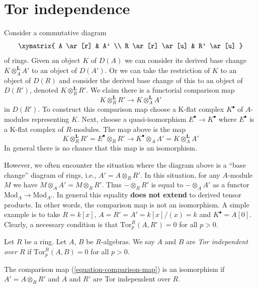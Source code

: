 \section{Tor independence}
\label{section-tor-independence}

\noindent
Consider a commutative diagram
$$
\xymatrix{
A \ar[r] & A' \\
R \ar[r] \ar[u] & R' \ar[u]
}
$$
of rings. Given an object $K$ of $D(A)$ we can consider its derived
base change $K \otimes_A^\mathbf{L} A'$ to an object of $D(A')$.
Or we can take the restriction of $K$ to an object of $D(R)$ and
consider the derived base change of this to an object of $D(R')$,
denoted $K \otimes_R^\mathbf{L} R'$.
We claim there is a functorial comparison map
\begin{equation}
\label{equation-comparison-map}
K \otimes_R^{\mathbf{L}} R'
\longrightarrow
K \otimes_A^{\mathbf{L}} A'
\end{equation}
in $D(R')$. To construct this comparison map choose a K-flat
complex $K^\bullet$ of $A$-modules representing $K$. Next, choose
a quasi-isomorphism $E^\bullet \to K^\bullet$ where $E^\bullet$
is a K-flat complex of $R$-modules. The map above is the map
$$
K \otimes_R^{\mathbf{L}} R' =
E^\bullet \otimes_R R'
\longrightarrow
K^\bullet \otimes_A A' =
K \otimes_A^{\mathbf{L}} A'
$$
In general there is no chance that this map is an isomorphism.

\medskip\noindent
However, we often encounter the situation where the diagram above
is a ``base change'' diagram of rings, i.e., $A' = A \otimes_R R'$.
In this situation, for any $A$-module $M$ we have
$M \otimes_A A' = M \otimes_R R'$. Thus $- \otimes_R R'$
is equal to $- \otimes_A A'$ as a functor $\text{Mod}_A \to \text{Mod}_{A'}$.
In general this equality {\bf does not extend} to derived tensor products.
In other words, the comparison map is not an isomorphism.
A simple example is to take
$R = k[x]$, $A = R' = A' = k[x]/(x) = k$ and $K^\bullet = A[0]$.
Clearly, a necessary condition is that $\text{Tor}_p^R(A, R') = 0$
for all $p > 0$.

\begin{definition}
\label{definition-tor-independent}
Let $R$ be a ring. Let $A$, $B$ be $R$-algebras. We say
$A$ and $B$ are {\it Tor independent over $R$} if
$\text{Tor}_p^R(A, B) = 0$ for all $p > 0$.
\end{definition}

\begin{lemma}
\label{lemma-base-change-comparison}
The comparison map (\ref{equation-comparison-map}) is an isomorphism
if $A' = A \otimes_R R'$ and $A$ and $R'$ are Tor independent over $R$.
\end{lemma}


